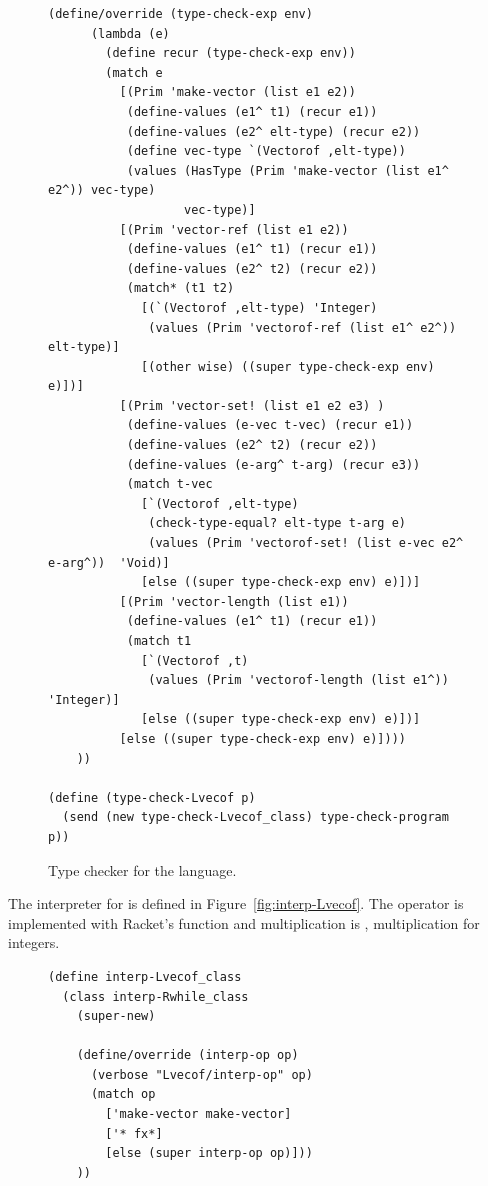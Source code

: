 \documentclass[7x10]{TimesAPriori_MIT}%
\begin{document}
{\begin{figure}[tbp]
\begin{lstlisting}[basicstyle=\ttfamily\footnotesize]
    (define/override (type-check-exp env)
      (lambda (e)
        (define recur (type-check-exp env))
        (match e
          [(Prim 'make-vector (list e1 e2))
           (define-values (e1^ t1) (recur e1))
           (define-values (e2^ elt-type) (recur e2))
           (define vec-type `(Vectorof ,elt-type))
           (values (HasType (Prim 'make-vector (list e1^ e2^)) vec-type)
                   vec-type)]
          [(Prim 'vector-ref (list e1 e2))
           (define-values (e1^ t1) (recur e1))
           (define-values (e2^ t2) (recur e2))
           (match* (t1 t2)
             [(`(Vectorof ,elt-type) 'Integer)
              (values (Prim 'vectorof-ref (list e1^ e2^)) elt-type)]
             [(other wise) ((super type-check-exp env) e)])]
          [(Prim 'vector-set! (list e1 e2 e3) )
           (define-values (e-vec t-vec) (recur e1))
           (define-values (e2^ t2) (recur e2))
           (define-values (e-arg^ t-arg) (recur e3))
           (match t-vec
             [`(Vectorof ,elt-type)
              (check-type-equal? elt-type t-arg e)
              (values (Prim 'vectorof-set! (list e-vec e2^ e-arg^))  'Void)]
             [else ((super type-check-exp env) e)])]
          [(Prim 'vector-length (list e1))
           (define-values (e1^ t1) (recur e1))
           (match t1
             [`(Vectorof ,t)
              (values (Prim 'vectorof-length (list e1^))  'Integer)]
             [else ((super type-check-exp env) e)])]
          [else ((super type-check-exp env) e)])))
    ))

(define (type-check-Lvecof p)
  (send (new type-check-Lvecof_class) type-check-program p))
\end{lstlisting}
\caption{Type checker for the \LangArray{} language.}
\label{fig:type-check-Lvecof}
\end{figure}

The interpreter for \LangArray{} is defined in
Figure~\ref{fig:interp-Lvecof}.  The  operator is
implemented with Racket's  function and
multiplication is , multiplication for 
integers.

\begin{figure}[tbp]
\begin{lstlisting}[basicstyle=\ttfamily\footnotesize]
(define interp-Lvecof_class
  (class interp-Rwhile_class
    (super-new)

    (define/override (interp-op op)
      (verbose "Lvecof/interp-op" op)
      (match op
        ['make-vector make-vector]
        ['* fx*]
        [else (super interp-op op)]))
    ))


\end{lstlisting}
\end{figure}}
\end{document}
